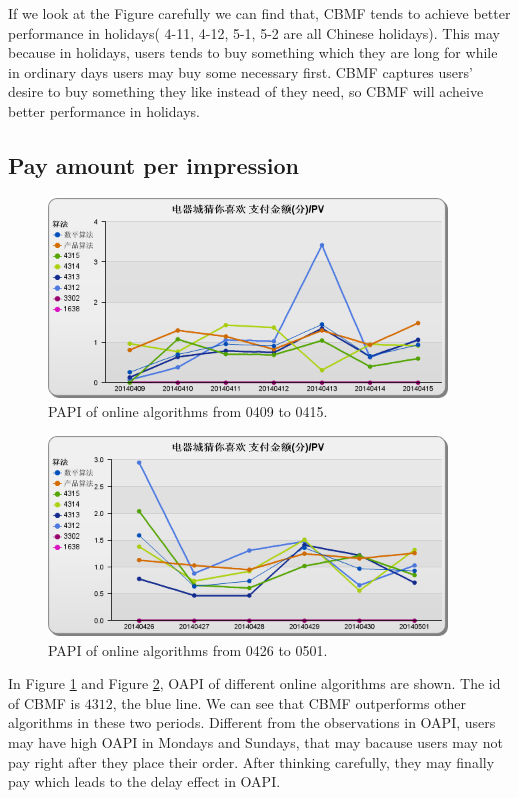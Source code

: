 If we look at the Figure carefully we can find that, CBMF tends to achieve better performance in holidays( 4-11, 4-12, 5-1, 5-2 are all Chinese holidays). This may because in holidays, users tends to buy something which they are long for while in ordinary days users may buy some necessary first. CBMF captures users' desire to buy something they like instead of they need, so CBMF will acheive better performance in holidays.


\subsection{Pay amount per impression}

\begin{figure}
\begin{center}

\includegraphics[width=400px]{fig/yixunexp/PAPI0415.png}
\caption{\label{fig:papi0415} PAPI of online algorithms  from 0409 to 0415.}
\end{center}
\end{figure}

\begin{figure}
\begin{center}

\includegraphics[width=400px]{fig/yixunexp/PAPI0421.png}
\caption{\label{fig:papi0501} PAPI of online algorithms  from 0426 to 0501.}
\end{center}
\end{figure}

In Figure \ref{fig:papi0415} and Figure \ref{fig:papi0501}, OAPI of different online algorithms are shown. The id of CBMF is $4312$, the blue line. We can see that CBMF outperforms other algorithms in these two periods. Different from the observations in OAPI, users may have high OAPI in Mondays and Sundays, that may bacause users may not pay right after they place their order. After thinking carefully, they may finally pay which leads to the delay effect in OAPI.
